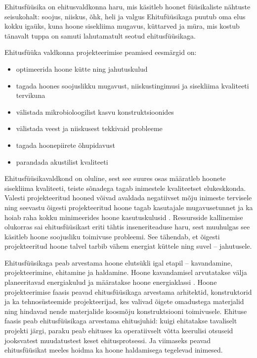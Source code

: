 \label{chapters:introduction}
Ehitusfüüsika on ehitusvaldkonna haru, mis käsitleb hoonet füüsikaliste nähtuste seisukohalt: soojus, niiskus, õhk, heli ja valgus
Ehitufüüsikaga puutub oma elus kokku igaüks, kuna hoone sisekliima mugavus, küttarved ja müra, mis kostub tänavalt tuppa
on samuti lahutamatult seotud ehitusfüüsikaga.

Ehitusfüüka valdkonna projekteerimise peamised eesmärgid on:
\begin{itemize}
    \item optimeerida hoone kütte ning jahutuskulud
    \item tagada hoones soojuslikku mugavust, niiskustingimusi ja sisekliima kvaliteeti tervikuna
    \item välistada mikrobioloogilist kasvu konstruktsioonides
    \item välistada veest ja niiskusest tekkivaid probleeme
    \item tagada hoonepiirete õhupidavust
    \item parandada akustilist kvaliteeti
\end{itemize}

Ehitusfüüsikavaldkond on oluline, sest see suures osas määratleb hoonete sisekliima kvaliteeti, teiste sõnadega tagab inimestele kvaliteetset 
elukeskkonda. Valesti projekteeritud hooned võivad avaldada negatiivset mõju inimeste tervisele \cite{rokka_hygrothermal} ning seevastu õigesti projekteeritud 
hoone tagab kasutajale mugavusetunnet ja ka hoiab raha kokku minimeerides hoone kasutuskulusid \cite{kalamees_phd}. Ressursside kallinemise olukorras sai 
ehitusfüüsikast eriti tähtis inseneriteaduse haru, sest muuhulgas see käsitleb hoone soojusliku toimivuse probleemi. See tähendab, et 
õigesti projekteeritud hoone talvel tarbib vähem energiat küttele ning suvel -- jahutusele.

Ehitusfüüsikaga peab arvestama hoone elutsükli igal etapil -- kavandamine, projekteerimine, ehitamine ja haldamine. Hoone kavandamisel 
arvutatakse välja planeeritavad energiakulud ja määratakse hoone energiaklassi \cite{energia_miinimum}. Hoone projekteerimise faasis peavad ehitusfüüsikaga arvestama arhitektid, 
konstruktorid ja ka tehnosüsteemide projekteerijad, kes valivad õigete omadustega materjalid ning hindavad nende materjalide koosmõju 
konstruktsiooni toimivusele. Ehituse faasis peab ehitusfüüsikaga arvestama ehitusjuhid: kuigi ehitatakse tavaliselt projekti järgi, 
paraku peab ehituses ka operatiivselt võtta keerulisi otsuseid jooksvatest muudatustest keset ehitusprotsessi. Ja viimaseks peavad 
ehitusfüüsikat meeles hoidma ka hoone haldamisega tegelevad inimesed.

